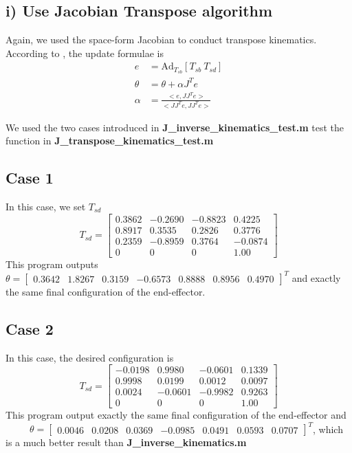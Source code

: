 \documentclass[english,10pt,a4paper]{article}
\begin{document}
    \subsection*{i) Use Jacobian Transpose algorithm}
    Again, we used the space-form Jacobian to conduct transpose kinematics. According to \cite{ik}, the update formulae is 
    \begin{align}
        e &= \text{Ad}_{T_{sb}} [T_{sb} \ T_{sd}]\\ \nonumber
        \theta &= \theta + \alpha J^T e \\
        \alpha &= \frac{<e, JJ^Te>}{<JJ^Te, JJ^Te>}
    \end{align}
    
    We used the two cases introduced in \textbf{J\_inverse\_kinematics\_test.m} test the function in \textbf{J\_transpose\_kinematics\_test.m}
    \subsection*{Case 1}
    In this case, we set $T_{sd}$
    \begin{equation}
        T_{sd} = \begin{bmatrix}
            0.3862 & -0.2690 & -0.8823 & 0.4225\\
            0.8917 & 0.3535 & 0.2826 & 0.3776\\
            0.2359 & -0.8959 & 0.3764 &  -0.0874\\
            0 & 0 & 0 & 1.00
        \end{bmatrix}
    \end{equation}
    This program outputs \(\theta = \begin{bmatrix} 0.3642 & 1.8267 & 0.3159 & -0.6573 & 0.8888 & 0.8956 & 0.4970 \end{bmatrix}^T\) and exactly the same final configuration of the end-effector.

    \subsection*{Case 2}
    In this case, the desired configuration is
    \begin{equation}
        T_{sd} = \begin{bmatrix}
            -0.0198 & 0.9980 & -0.0601 & 0.1339\\
            0.9998 & 0.0199 & 0.0012 & 0.0097\\
            0.0024 & -0.0601 & -0.9982 & 0.9263\\
            0 & 0 & 0 & 1.00
        \end{bmatrix}
    \end{equation}
    This program output exactly the same final configuration of the end-effector and \ \ \ \ \ \(\theta = \begin{bmatrix} 0.0046 & 0.0208 & 0.0369 & -0.0985 & 0.0491 & 0.0593 & 0.0707 \end{bmatrix}^T\), which is a much better result than \textbf{J\_inverse\_kinematics.m}
    
\end{document}
